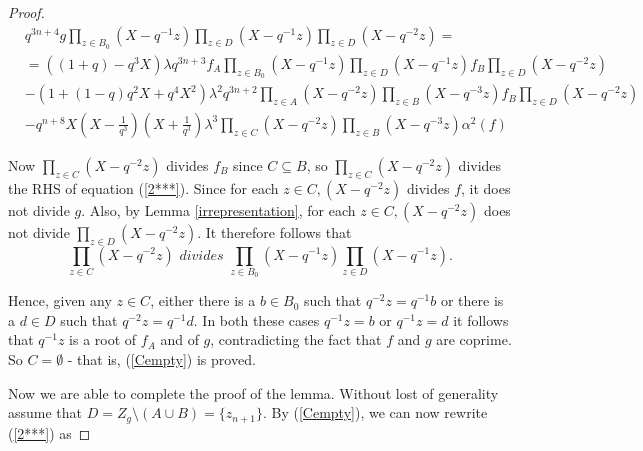 \documentclass[10pt,a4paper]{amsart}
\begin{document}
\begin{proof}

\begin{equation}\label{2***}
\begin{split}
&q^{3n+4}g \prod_{z\in B_0}(X-q^{-1}z)\prod_{z\in D}(X-q^{-1}z)\prod_{z\in D}(X-q^{-2}z)=\\
&=\left((1+q)-q^3X\right)\lambda q^{3n+3}f_A\prod_{z\in B_0}(X-q^{-1}z)\prod_{z\in D}(X-q^{-1}z)f_B\prod_{z\in D}(X-q^{-2}z)\\
&-\left(1+(1-q)q^2X+q^4X^2\right)\lambda^2q^{3n+2}\prod_{z\in A}(X-q^{-2}z)\prod_{z\in B}(X-q^{-3}z)f_B\prod_{z\in D}(X-q^{-2}z)\\
&-q^{n+8}X(X-\frac{1}{q^3})(X+\frac{1}{q^3})\lambda^3\prod_{z\in C}(X-q^{-2}z)\prod_{z\in B}(X-q^{-3}z)\alpha^2(f)
\end{split}
\end{equation}

Now $\prod_{z\in C}(X-q^{-2}z)$ divides $f_B$ since $C\subseteq B$, so $\prod_{z\in C}(X-q^{-2}z)$ divides the RHS of equation (\ref{2***}). Since for each $z\in C, (X-q^{-2}z)$ divides $f$, it does not divide $g$. Also, by Lemma \ref{irrepresentation},  for each $z\in C, (X-q^{-2}z)$ does not divide $\prod_{z\in D}(X-q^{-2}z)$. It therefore follows that
\begin{equation}\label{division}\prod_{z\in C}(X-q^{-2}z) \textit{ divides } \prod_{z\in B_0}(X-q^{-1}z)\prod_{z\in D}(X-q^{-1}z).\end{equation}

\noindent Hence, given any $z\in C$, either there is a $b\in B_0$ such that $q^{-2}z=q^{-1}b$ or there is a $d\in D$ such that $q^{-2}z=q^{-1}d$. In both these cases $q^{-1}z=b$ or $q^{-1}z=d$ it follows that  $q^{-1}z$  is a root of $f_A$ and of $g$, contradicting the fact that $f$ and $g$ are coprime. So $C=\emptyset$ - that is,  (\ref{Cempty}) is proved.

\medskip

Now we are able to complete the proof of the lemma. Without lost of generality assume that $D=Z_g\setminus (A\cup B)=\{z_{n+1}\}$. By (\ref{Cempty}), we can now rewrite (\ref{2***}) as




\end{proof}
\end{document}
